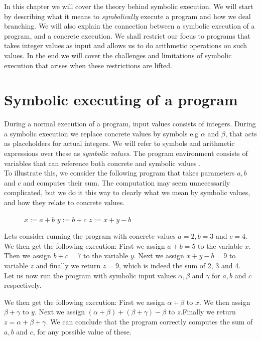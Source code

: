 In this chapter we will cover the theory behind symbolic execution. We will start by describing what it means to \emph{symbolically} execute a program and how we deal branching. We will also explain the connection between a symbolic execution of a program, and a concrete execution. We shall restrict our focus to programs that takes integer values as input and allows us to do arithmetic operations on such values. In the end we will cover the challenges and limitations of symbolic execution that arises when these restrictions are lifted. 


\section{Symbolic executing of a program}
	
	During a normal execution of a program, input values consists of integers. During a symbolic execution we replace concrete values by symbols e.g $\alpha$ and $ \beta$, that acts as placeholders for actual integers. We will refer to symbols and arithmetic expressions over these as \emph{symbolic values}.
	 The program environment consists of variables that can reference both concrete and symbolic values \citep{CadarSen13} \citep{King76}.
	\\
	To illustrate this, we consider the following program that takes parameters $a, b$ and $ c$ and computes their sum. The computation may seem unnecessarily complicated, but we do it this way to clearly what we mean by symbolic values, and how they relate to concrete values.
	\begin{figure}[!h]
		\begin{algorithmic}
			\State $ x := a + b$
			\State $ y := b + c$
			\State $ z := x + y - b$
			\State {}
			\EndProcedure
		\end{algorithmic}
	\end{figure}

	\sumprogram{}
	\newpage
	Lets consider running the program with concrete values $a = 2, b = 3$ and $c = 4$. We then get the following execution:
	First we assign $a+b = 5$ to the variable $x$. Then we assign $b + c = 7$ to the variable $y$. Next we assign $x + y - b = 9$ to variable $z$ and finally we return $z = 9$, which is indeed the sum of 2, 3 and 4. 
	\\
	Let us now run the program with symbolic input values $\alpha, \beta$ and $\gamma$ for $a, b$ and $c$ respectively. 

	
	We then get the following execution: First we assign $\alpha + \beta$ to $x$. We then assign $\beta + \gamma$ to $y$. Next we assign $(\alpha + \beta) + (\beta + \gamma) - \beta$ to $z$.Finally we return $z = \alpha + \beta + \gamma$. We can conclude that the program correctly computes the sum of $a, b$ and $c$, for any possible value of these.
	
